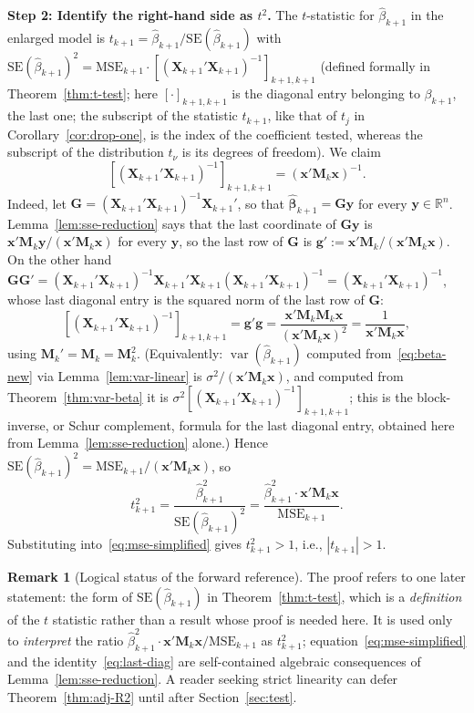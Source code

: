 \documentclass[12pt,a4paper]{article}
\makeatletter
\theoremstyle{definition}
\newtheorem{remark}[theorem]{Remark}
\renewenvironment{proof}[1][\proofname]{\par
  \pushQED{\qed}%
  \normalfont \topsep6\p@\@plus6\p@\relax
  \trivlist
  \item[\hskip\labelsep\bfseries #1\@addpunct{.}]\ignorespaces
}{%
  \popQED\endtrivlist\@endpefalse
}
\DeclareMathOperator\var{var}
\newcommand{\MSE}{\mathrm{MSE}}
\newcommand{\SE}{\mathrm{SE}}
\newcommand{\bX}{\mathbf{X}}
\newcommand{\by}{\mathbf{y}}
\newcommand{\bx}{\mathbf{x}}
\def\bb{\boldsymbol{\beta}}
\newcommand{\bM}{\mathbf{M}}
\newcommand{\Real}{\mathbb{R}}
\makeatother
\begin{document}
\begin{proof}
\textbf{Step 2: Identify the right-hand side as $t^2$.}
The $t$-statistic for $\hat{\beta}_{k+1}$ in the enlarged model is $t_{k+1} = \hat{\beta}_{k+1}/\SE(\hat{\beta}_{k+1})$ with $\SE(\hat{\beta}_{k+1})^2 = \MSE_{k+1}\cdot [(\bX_{k+1}'\bX_{k+1})^{-1}]_{k+1,k+1}$ (defined formally in Theorem~\ref{thm:t-test}; here $[\cdot]_{k+1,k+1}$ is the diagonal entry belonging to $\beta_{k+1}$, the last one; the subscript of the statistic $t_{k+1}$, like that of $t_j$ in Corollary~\ref{cor:drop-one}, is the index of the coefficient tested, whereas the subscript of the distribution $t_\nu$ is its degrees of freedom). We claim
\begin{equation}\label{eq:last-diag}
[(\bX_{k+1}'\bX_{k+1})^{-1}]_{k+1,k+1} = (\bx'\bM_k\bx)^{-1}.
\end{equation}
Indeed, let $\mathbf{G} = (\bX_{k+1}'\bX_{k+1})^{-1}\bX_{k+1}'$, so that $\hat{\bb}_{k+1} = \mathbf{G}\by$ for every $\by \in \Real^n$. Lemma~\ref{lem:sse-reduction} says that the last coordinate of $\mathbf{G}\by$ is $\bx'\bM_k\by/(\bx'\bM_k\bx)$ for every $\by$, so the last row of $\mathbf{G}$ is $\mathbf{g}' := \bx'\bM_k/(\bx'\bM_k\bx)$. On the other hand $\mathbf{G}\mathbf{G}' = (\bX_{k+1}'\bX_{k+1})^{-1}\bX_{k+1}'\bX_{k+1}(\bX_{k+1}'\bX_{k+1})^{-1} = (\bX_{k+1}'\bX_{k+1})^{-1}$, whose last diagonal entry is the squared norm of the last row of $\mathbf{G}$:
\[
[(\bX_{k+1}'\bX_{k+1})^{-1}]_{k+1,k+1} = \mathbf{g}'\mathbf{g} = \frac{\bx'\bM_k\bM_k\bx}{(\bx'\bM_k\bx)^2} = \frac{1}{\bx'\bM_k\bx},
\]
using $\bM_k' = \bM_k = \bM_k^2$. (Equivalently: $\var(\hat{\beta}_{k+1})$ computed from~\eqref{eq:beta-new} via Lemma~\ref{lem:var-linear} is $\sigma^2/(\bx'\bM_k\bx)$, and computed from Theorem~\ref{thm:var-beta} it is $\sigma^2[(\bX_{k+1}'\bX_{k+1})^{-1}]_{k+1,k+1}$; this is the block-inverse, or Schur complement, formula for the last diagonal entry, obtained here from Lemma~\ref{lem:sse-reduction} alone.) Hence $\SE(\hat{\beta}_{k+1})^2 = \MSE_{k+1}/(\bx'\bM_k\bx)$, so
\[
t_{k+1}^2 = \frac{\hat{\beta}_{k+1}^2}{\SE(\hat{\beta}_{k+1})^2} = \frac{\hat{\beta}_{k+1}^2\cdot\bx'\bM_k\bx}{\MSE_{k+1}}.
\]
Substituting into~\eqref{eq:mse-simplified} gives $t_{k+1}^2 > 1$, i.e., $|t_{k+1}| > 1$.
\end{proof}

\begin{remark}[Logical status of the forward reference]\label{rem:forward-adjR2}
The proof refers to one later statement: the form of $\SE(\hat{\beta}_{k+1})$ in Theorem~\ref{thm:t-test}, which is a \emph{definition} of the $t$ statistic rather than a result whose proof is needed here. It is used only to \emph{interpret} the ratio $\hat{\beta}_{k+1}^2\cdot\bx'\bM_k\bx/\MSE_{k+1}$ as $t_{k+1}^2$; equation~\eqref{eq:mse-simplified} and the identity~\eqref{eq:last-diag} are self-contained algebraic consequences of Lemma~\ref{lem:sse-reduction}. A reader seeking strict linearity can defer Theorem~\ref{thm:adj-R2} until after Section~\ref{sec:test}.
\end{remark}
\end{document}

